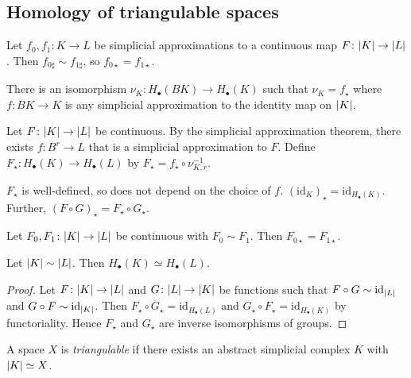 \subsection{Homology of triangulable spaces}
\begin{theorem}
	Let \( f_0, f_1 \colon K \to L \) be simplicial approximations to a continuous map \( F \colon \abs{K} \to \abs{L} \).
	Then \( f_{0\sharp} \sim f_{1\sharp} \), so \( f_{0\star} = f_{1\star} \).
\end{theorem}
\begin{theorem}
	There is an isomorphism \( \nu_K \colon H_\bullet(B K) \to H_\bullet(K) \) such that \( \nu_K = f_\star \) where \( f \colon B K \to K \) is any simplicial approximation to the identity map on \( \abs{K} \).
\end{theorem}
\begin{definition}
	Let \( F \colon \abs{K} \to \abs{L} \) be continuous.
	By the simplicial approximation theorem, there exists \( f \colon B^r \to L \) that is a simplicial approximation to \( F \).
	Define \( F_\star \colon H_\bullet(K) \to H_\bullet(L) \) by \( F_\star = f_\star \circ \nu_{K,r}^{-1} \).
\end{definition}
\begin{theorem}
	\( F_\star \) is well-defined, so does not depend on the choice of \( f \).
	\( (\mathrm{id}_K)_\star = \mathrm{id}_{H_\bullet(K)} \).
	Further, \( (F \circ G)_\star = F_\star \circ G_\star \).
\end{theorem}
\begin{theorem}
	Let \( F_0, F_1 \colon \abs{K} \to \abs{L} \) be continuous with \( F_0 \sim F_1 \).
	Then \( F_{0\star} = F_{1\star} \).
\end{theorem}
\begin{proposition}
	Let \( \abs{K} \sim \abs{L} \).
	Then \( H_\bullet(K) \simeq H_\bullet(L) \).
\end{proposition}
\begin{proof}
	Let \( F \colon \abs{K} \to \abs{L} \) and \( G \colon \abs{L} \to \abs{K} \) be functions such that \( F \circ G \sim \mathrm{id}_{\abs{L}} \) and \( G \circ F \sim \mathrm{id}_{\abs{K}} \).
	Then \( F_\star \circ G_\star = \mathrm{id}_{H_\bullet(L)} \) and \( G_\star \circ F_\star = \mathrm{id}_{H_\bullet(K)} \) by functoriality.
	Hence \( F_\star \) and \( G_\star \) are inverse isomorphisms of groups.
\end{proof}
\begin{definition}
	A space \( X \) is \emph{triangulable} if there exists an abstract simplicial complex \( K \) with \( \abs{K} \simeq X \).
\end{definition}
